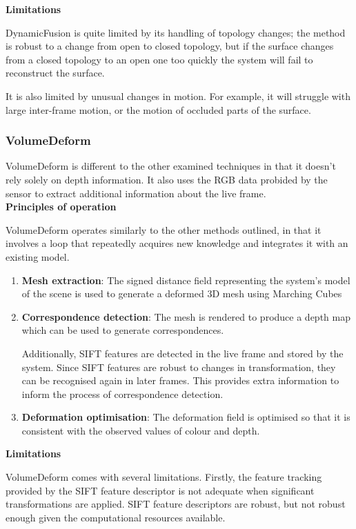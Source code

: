 \documentclass[a4paper]{article}
\begin{document}
\noindent\textbf{Limitations}

DynamicFusion is quite limited by its handling of topology changes; the method is robust to a change from open to closed topology, but if the surface changes from a closed topology to an open one too quickly the system will fail to reconstruct the surface.

It is also limited by unusual changes in motion. For example, it will struggle with large inter-frame motion, or the motion of occluded parts of the surface.


\subsubsection{VolumeDeform}

VolumeDeform is different to the other examined techniques in that it doesn't rely solely on depth information. It also uses the RGB data probided by the sensor to extract additional information about the live frame.\\ 


\noindent\textbf{Principles of operation}

VolumeDeform operates similarly to the other methods outlined, in that it involves a loop that repeatedly acquires new knowledge and integrates it with an existing model.

\begin{enumerate}
\item \textbf{Mesh extraction}: The signed distance field representing the system's model of the scene is used to generate a deformed 3D mesh using Marching Cubes
\item \textbf{Correspondence detection}: The mesh is rendered to produce a depth map which can be used to generate correspondences. 

Additionally, SIFT features are detected in the live frame and stored by the system. Since SIFT features are robust to changes in transformation, they can be recognised again in later frames. This provides extra information to inform the process of correspondence detection. 

\item \textbf{Deformation optimisation}: The deformation field is optimised so that it is consistent with the observed values of colour and depth.
\end{enumerate}

\noindent\textbf{Limitations}

VolumeDeform comes with several limitations. Firstly, the feature tracking provided by the SIFT feature descriptor is not adequate when significant transformations are applied. SIFT feature descriptors are robust, but not robust enough given the computational resources available.
\end{document}
